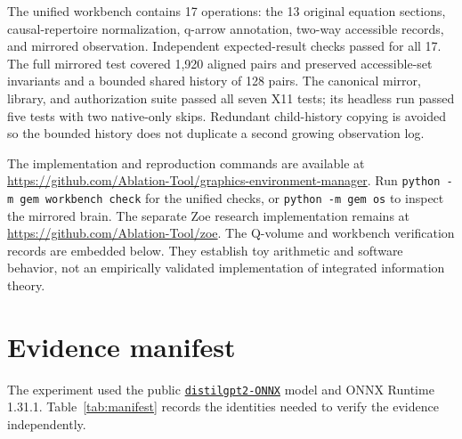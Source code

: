 \documentclass[11pt,a4paper]{article}
\begin{document}
The unified workbench contains 17 operations: the 13 original equation sections, causal-repertoire normalization, q-arrow annotation, two-way accessible records, and mirrored observation. Independent expected-result checks passed for all 17. The full mirrored test covered 1,920 aligned pairs and preserved accessible-set invariants and a bounded shared history of 128 pairs. The canonical mirror, library, and authorization suite passed all seven X11 tests; its headless run passed five tests with two native-only skips. Redundant child-history copying is avoided so the bounded history does not duplicate a second growing observation log.

The implementation and reproduction commands are available at \url{https://github.com/Ablation-Tool/graphics-environment-manager}. Run \texttt{python -m gem workbench check} for the unified checks, or \texttt{python -m gem os} to inspect the mirrored brain. The separate Zoe research implementation remains at \url{https://github.com/Ablation-Tool/zoe}. The Q-volume and workbench verification records are embedded below. They establish toy arithmetic and software behavior, not an empirically validated implementation of integrated information theory.

\section{Evidence manifest}
The experiment used the public \href{https://huggingface.co/onnx-community/distilgpt2-ONNX}{\texttt{distilgpt2-ONNX}} model and ONNX Runtime 1.31.1. Table~\ref{tab:manifest} records the identities needed to verify the evidence independently.
\end{document}

